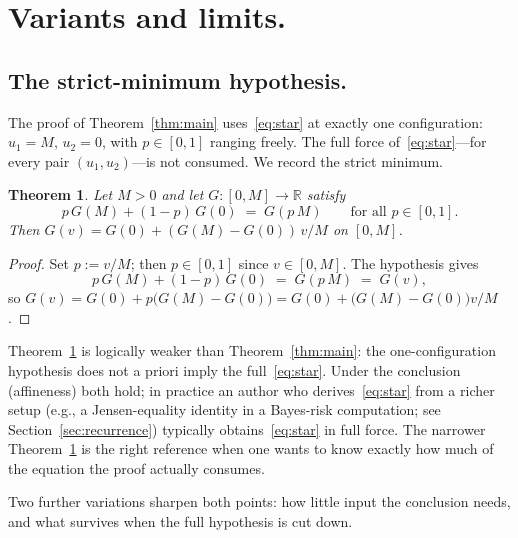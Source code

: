 \documentclass{article}
\theoremstyle{plain}
\newtheorem{theorem}{Theorem}
\theoremstyle{definition}
\newcommand{\R}{\mathbb{R}}
\begin{document}
\section{Variants and limits.}
\label{sec:variants}

\subsection{The strict-minimum hypothesis.}
\label{ssec:weak}

The proof of Theorem~\ref{thm:main} uses~\eqref{eq:star} at exactly one
configuration: $u_1=M$, $u_2=0$, with $p\in[0,1]$ ranging freely. The
full force of~\eqref{eq:star}---for every pair $(u_1,u_2)$---is not
consumed. We record the strict minimum.

\begin{theorem}\label{thm:weak}
Let $M>0$ and let $G\colon[0,M]\to\R$ satisfy
\[
p\,G(M)+(1-p)\,G(0) \;=\; G(p\,M) \qquad \text{for all }p\in[0,1].
\]
Then $G(v)=G(0)+(G(M)-G(0))\,v/M$ on $[0,M]$.
\end{theorem}

\begin{proof}
Set $p:=v/M$; then $p\in[0,1]$ since $v\in[0,M]$. The hypothesis gives
\[
p\,G(M)+(1-p)\,G(0) \;=\; G(p\,M) \;=\; G(v),
\]
so $G(v)=G(0)+p\bigl(G(M)-G(0)\bigr)=G(0)+\bigl(G(M)-G(0)\bigr)v/M$.
\end{proof}

Theorem~\ref{thm:weak} is logically weaker than
Theorem~\ref{thm:main}: the one-configuration hypothesis does not a priori imply
the full~\eqref{eq:star}. Under the conclusion (affineness) both hold;
in practice an author who derives~\eqref{eq:star} from a richer setup
(e.g., a Jensen-equality identity in a Bayes-risk computation;
see Section~\ref{sec:recurrence}) typically obtains~\eqref{eq:star} in
full force. The narrower Theorem~\ref{thm:weak} is the right reference
when one wants to know exactly how much of the equation the proof
actually consumes.

Two further variations sharpen both points: how little input the conclusion needs, and what survives when the full hypothesis is cut
down.
\end{document}

